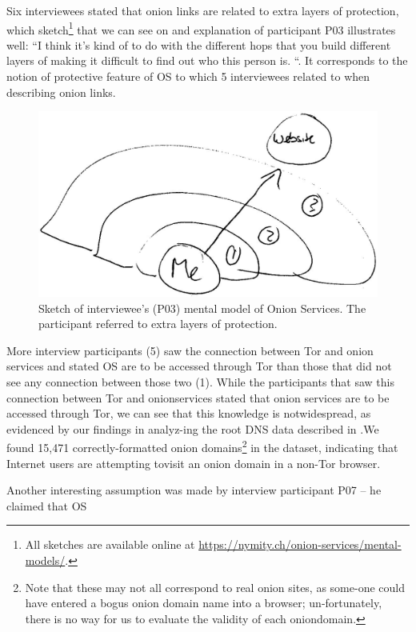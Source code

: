 Six interviewees stated that onion links are related to extra layers of protection, which sketch\footnote{All sketches are available online at
\url{https://nymity.ch/onion-services/mental-models/}.} that we can see on  and explanation of participant P03 illustrates well:   “I think it's kind of to do with the different hops that you build different layers of making it difficult to find out who this person is. “. It corresponds to the notion of protective feature of OS to which 5 interviewees related to when describing onion links.


\begin{figure}[!ht]
    \centering
        \centering
        \includegraphics[width=0.8\linewidth]{figures/p03-os-sketch-kopia2.jpg}
        \caption{Sketch of interviewee's (P03) mental model of Onion Services. The participant referred to extra layers of protection.}
        \label{fig:os-sketch}
\end{figure}

More interview participants (5) saw the connection between Tor and onion services and stated OS are to be accessed through Tor than those that did not see any connection between those two (1).  While the participants that saw this connection between Tor and onionservices  stated  that  onion  services are to be accessed through Tor, we can  see that this knowledge is notwidespread, as evidenced by our findings in analyz-ing the root DNS data described in .We found 15,471 correctly-formatted onion domains\footnote{Note that these may not all correspond to real onion sites, as some-one could have entered a bogus onion domain name into a browser; un-fortunately, there is no way for us to evaluate the validity of each oniondomain.} in the dataset,  indicating that Internet users are attempting tovisit an onion domain in a non-Tor browser.

Another interesting assumption was made by interview participant P07 – he claimed that OS 

